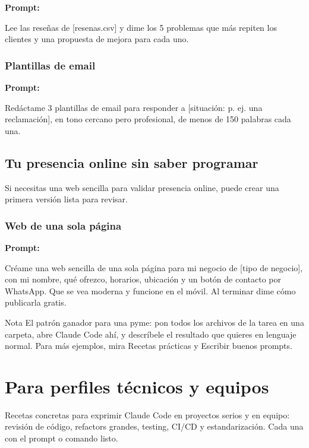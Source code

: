 \documentclass[11pt,a4paper]{report}
\begin{document}
\noindent\textbf{Prompt: }
\begin{codebox}
Lee las reseñas de [resenas.csv] y dime los 5 problemas que más repiten los clientes y una propuesta de mejora para cada uno.
\end{codebox}

\subsection{Plantillas de email}

\noindent\textbf{Prompt: }
\begin{codebox}
Redáctame 3 plantillas de email para responder a [situación: p. ej. una reclamación], en tono cercano pero profesional, de menos de 150 palabras cada una.
\end{codebox}

\section{ Tu presencia online sin saber programar}

Si necesitas una web sencilla para validar presencia online, puede crear una primera versión lista para revisar.

\subsection{Web de una sola página}

\noindent\textbf{Prompt: }
\begin{codebox}
Créame una web sencilla de una sola página para mi negocio de [tipo de negocio], con mi nombre, qué ofrezco, horarios, ubicación y un botón de contacto por WhatsApp. Que se vea moderna y funcione en el móvil. Al terminar dime cómo publicarla gratis.
\end{codebox}

\begin{calloutbox}{Nota}
El patrón ganador para una pyme: pon todos los archivos de la tarea en una carpeta, abre Claude Code ahí, y descríbele el resultado que quieres en lenguaje normal. Para más ejemplos, mira Recetas prácticas y Escribir buenos prompts.\end{calloutbox}


\chapter{Para perfiles técnicos y equipos}

Recetas concretas para exprimir Claude Code en proyectos serios y en equipo: revisión de código, refactors grandes, testing, CI/CD y estandarización. Cada una con el prompt o comando listo.
\end{document}

